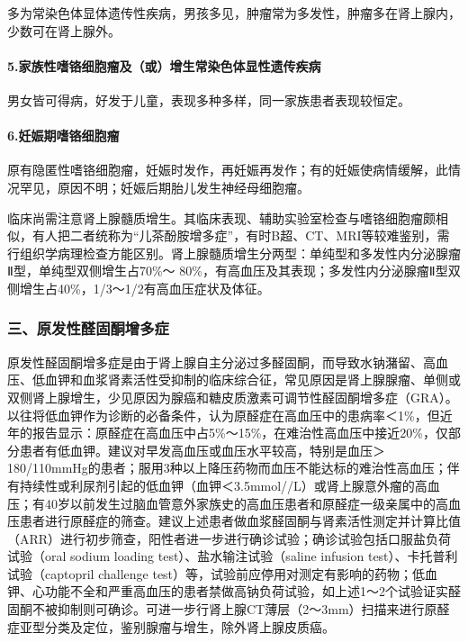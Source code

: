 多为常染色体显体遗传性疾病，男孩多见，肿瘤常为多发性，肿瘤多在肾上腺内，少数可在肾上腺外。

\paragraph{5.家族性嗜铬细胞瘤及（或）增生常染色体显性遗传疾病}

男女皆可得病，好发于儿童，表现多种多样，同一家族患者表现较恒定。

\paragraph{6.妊娠期嗜铬细胞瘤}

原有隐匿性嗜铬细胞瘤，妊娠时发作，再妊娠再发作；有的妊娠使病情缓解，此情况罕见，原因不明；妊娠后期胎儿发生神经母细胞瘤。

临床尚需注意肾上腺髓质增生。其临床表现、辅助实验室检查与嗜铬细胞瘤颇相似，有人把二者统称为“儿茶酚胺增多症”，有时B超、CT、MRI等较难鉴别，需行组织学病理检查方能区别。肾上腺髓质增生分两型：单纯型和多发性内分泌腺瘤Ⅱ型，单纯型双侧增生占70\%～
80\%，有高血压及其表现；多发性内分泌腺瘤Ⅱ型双侧增生占40\%，1/3～1/2有高血压症状及体征。

\subsubsection{三、原发性醛固酮增多症}

原发性醛固酮增多症是由于肾上腺自主分泌过多醛固酮，而导致水钠潴留、高血压、低血钾和血浆肾素活性受抑制的临床综合征，常见原因是肾上腺腺瘤、单侧或双侧肾上腺增生，少见原因为腺癌和糖皮质激素可调节性醛固酮增多症（GRA）。以往将低血钾作为诊断的必备条件，认为原醛症在高血压中的患病率＜1\%，但近年的报告显示：原醛症在高血压中占5\%～15\%，在难治性高血压中接近20\%，仅部分患者有低血钾。建议对早发高血压或血压水平较高，特别是血压＞180/110mmHg的患者；服用3种以上降压药物而血压不能达标的难治性高血压；伴有持续性或利尿剂引起的低血钾（血钾＜3.5mmol//L）或肾上腺意外瘤的高血压；有40岁以前发生过脑血管意外家族史的高血压患者和原醛症一级亲属中的高血压患者进行原醛症的筛查。建议上述患者做血浆醛固酮与肾素活性测定并计算比值（ARR）进行初步筛查，阳性者进一步进行确诊试验；确诊试验包括口服盐负荷试验（oral
sodium loading test）、盐水输注试验（saline infusion
test）、卡托普利试验（captopril challenge
test）等，试验前应停用对测定有影响的药物；低血钾、心功能不全和严重高血压的患者禁做高钠负荷试验，如上述1～2个试验证实醛固酮不被抑制则可确诊。可进一步行肾上腺CT薄层（2～3mm）扫描来进行原醛症亚型分类及定位，鉴别腺瘤与增生，除外肾上腺皮质癌。

